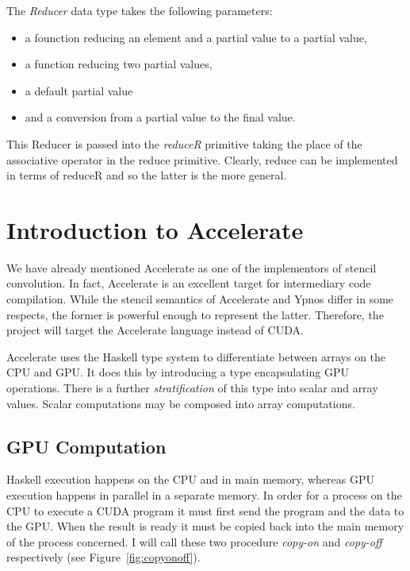 \documentclass[12pt,a4paper,twoside]{scrbook}
\begin{document}
The \emph{Reducer} data type takes the following parameters:

\begin{itemize}
\itemsep1pt\parskip0pt
\item
  a founction reducing an element and a partial value to a partial value,
\item
  a function reducing two partial values,
\item
  a default partial value
\item
  and a conversion from a partial value to the final value.
\end{itemize}

This Reducer is passed into the \emph{reduceR} primitive taking the place of the
associative operator in the reduce primitive. Clearly, reduce can be implemented
in terms of reduceR and so the latter is the more general.

\section{Introduction to Accelerate}

We have already mentioned Accelerate as one of the implementors of stencil
convolution. In fact, Accelerate is an excellent target for intermediary code
compilation. While the stencil semantics of Accelerate and Ypnos differ in some
respects, the former is powerful enough to represent the latter. Therefore, the
project will target the Accelerate language instead of CUDA.

Accelerate uses the Haskell type system to differentiate between arrays
on the CPU and GPU. It does this by introducing a type encapsulating GPU
operations. There is a further \emph{stratification} of this type into
scalar and array values. Scalar computations may be composed into
array computations.

\subsection{GPU Computation}

Haskell execution happens on the CPU and in main memory, whereas GPU execution
happens in parallel in a separate memory. In order for a process on the CPU to
execute a CUDA program it must first send the program and the data to the
GPU. When the result is ready it must be copied back into the main memory of the
process concerned. I will call these two procedure \emph{copy-on} and
\emph{copy-off} respectively (see Figure~\ref{fig:copyonoff}).
\end{document}
